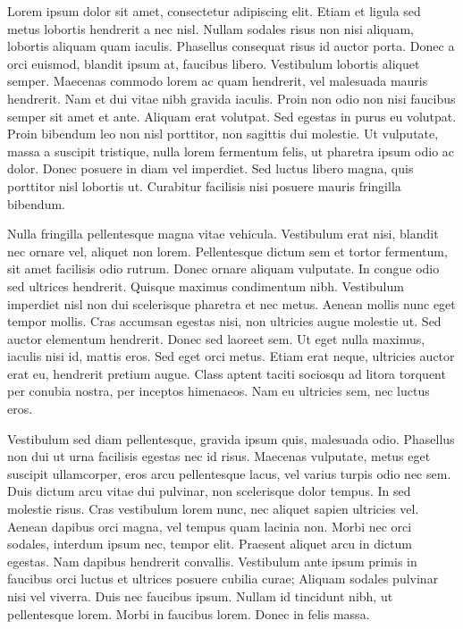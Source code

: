\documentclass[11pt,twoside]{article}
\begin{document}


Lorem ipsum dolor sit amet, consectetur adipiscing elit. Etiam et ligula sed metus lobortis hendrerit a nec nisl. Nullam sodales risus non nisi aliquam, lobortis aliquam quam iaculis. Phasellus consequat risus id auctor porta. Donec a orci euismod, blandit ipsum at, faucibus libero. Vestibulum lobortis aliquet semper. Maecenas commodo lorem ac quam hendrerit, vel malesuada mauris hendrerit. Nam et dui vitae nibh gravida iaculis. Proin non odio non nisi faucibus semper sit amet et ante. Aliquam erat volutpat. Sed egestas in purus eu volutpat. Proin bibendum leo non nisl porttitor, non sagittis dui molestie. Ut vulputate, massa a suscipit tristique, nulla lorem fermentum felis, ut pharetra ipsum odio ac dolor. Donec posuere in diam vel imperdiet. Sed luctus libero magna, quis porttitor nisl lobortis ut. Curabitur facilisis nisi posuere mauris fringilla bibendum.

Nulla fringilla pellentesque magna vitae vehicula. Vestibulum erat nisi, blandit nec ornare vel, aliquet non lorem. Pellentesque dictum sem et tortor fermentum, sit amet facilisis odio rutrum. Donec ornare aliquam vulputate. In congue odio sed ultrices hendrerit. Quisque maximus condimentum nibh. Vestibulum imperdiet nisl non dui scelerisque pharetra et nec metus. Aenean mollis nunc eget tempor mollis. Cras accumsan egestas nisi, non ultricies augue molestie ut. Sed auctor elementum hendrerit. Donec sed laoreet sem. Ut eget nulla maximus, iaculis nisi id, mattis eros. Sed eget orci metus. Etiam erat neque, ultricies auctor erat eu, hendrerit pretium augue. Class aptent taciti sociosqu ad litora torquent per conubia nostra, per inceptos himenaeos. Nam eu ultricies sem, nec luctus eros.

Vestibulum sed diam pellentesque, gravida ipsum quis, malesuada odio. Phasellus non dui ut urna facilisis egestas nec id risus. Maecenas vulputate, metus eget suscipit ullamcorper, eros arcu pellentesque lacus, vel varius turpis odio nec sem. Duis dictum arcu vitae dui pulvinar, non scelerisque dolor tempus. In sed molestie risus. Cras vestibulum lorem nunc, nec aliquet sapien ultricies vel. Aenean dapibus orci magna, vel tempus quam lacinia non. Morbi nec orci sodales, interdum ipsum nec, tempor elit. Praesent aliquet arcu in dictum egestas. Nam dapibus hendrerit convallis. Vestibulum ante ipsum primis in faucibus orci luctus et ultrices posuere cubilia curae; Aliquam sodales pulvinar nisi vel viverra. Duis nec faucibus ipsum. Nullam id tincidunt nibh, ut pellentesque lorem. Morbi in faucibus lorem. Donec in felis massa.
\end{document}
